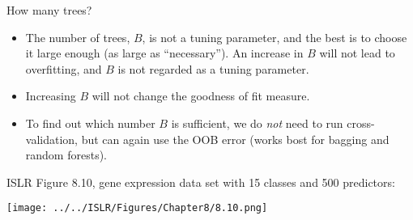 \documentclass[10pt,ignorenonframetext,]{beamer}
\providecommand{\tightlist}{%
  \setlength{\itemsep}{0pt}\setlength{\parskip}{0pt}}
\begin{document}
\begin{frame}

\begin{block}{How many trees?}

\vspace{2mm}

\begin{itemize}
\tightlist
\item
  The number of trees, \(B\), is not a tuning parameter, and the best is
  to choose it large enough (as large as ``necessary''). An increase in
  \(B\) will not lead to overfitting, and \(B\) is not regarded as a
  tuning parameter.
\end{itemize}

\vspace{2mm}

\begin{itemize}
\tightlist
\item
  Increasing \(B\) will not change the goodness of fit measure.
\end{itemize}

\vspace{2mm}

\begin{itemize}
\tightlist
\item
  To find out which number \(B\) is sufficient, we do \emph{not} need to
  run cross-validation, but can again use the OOB error (works bost for
  bagging and random forests).
\end{itemize}

\end{block}

\end{frame}

\begin{frame}

ISLR Figure 8.10, gene expression data set with 15 classes and 500
predictors: \vspace{-3mm}

\centering

\texttt{[image: ../../ISLR/Figures/Chapter8/8.10.png]}

\end{frame}
\end{document}
